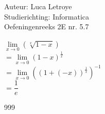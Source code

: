 \documentclass[a4paper]{article}
\begin{document}
  
\noindent \large Auteur: Luca Letroye        \\
\noindent \large Studierichting: Informatica \\
\noindent \large Oefeningenreeks 2E nr. 5.7 \\

\medskip

\normalsize


$\lim\limits_{x \rightarrow 0} \left( \sqrt[x]{1-x} \right) $\\

$ = \lim\limits_{x \rightarrow 0} \left( 1-x \right)^{\tfrac{1}{x}} $\\

$ = \lim\limits_{x \rightarrow 0} \left( \left( 1+ (-x) \right)^{\tfrac{1}{x}}\right)^{-1} $\\

$ = \dfrac{1}{e}$







\begin{thebibliography}{999}
\end{thebibliography}
\end{document}
